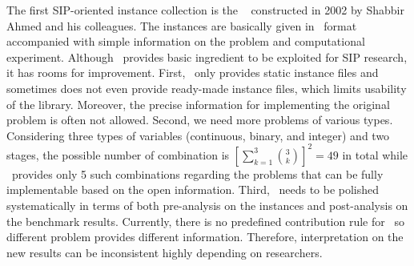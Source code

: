 The first SIP-oriented instance collection is the \siplib\ \cite{web:SIPLIB1} constructed in 2002 by Shabbir Ahmed and his colleagues. The instances are basically given in \smps\ format accompanied with simple information on the problem and computational experiment. Although \siplib\ provides basic ingredient to be exploited for SIP research, it has rooms for improvement. First, \siplib\ only provides static instance files and sometimes does not even provide ready-made instance files, which limits usability of the library. Moreover, the precise information for implementing the original problem is often not allowed. Second, we need more problems of various types. Considering three types of variables (continuous, binary, and integer) and two stages, the possible number of combination is $\left[\sum_{k=1}^3\binom{3}{k}\right]^2=49$ in total while \siplib\ provides only 5 such combinations regarding the problems that can be fully implementable based on the open information.
Third, \siplib\ needs to be polished systematically in terms of both pre-analysis on the instances and post-analysis on the benchmark results. Currently, there is no predefined contribution rule for \siplib\ so different problem provides different information. Therefore, interpretation on the new results can be inconsistent highly depending on researchers.

 


